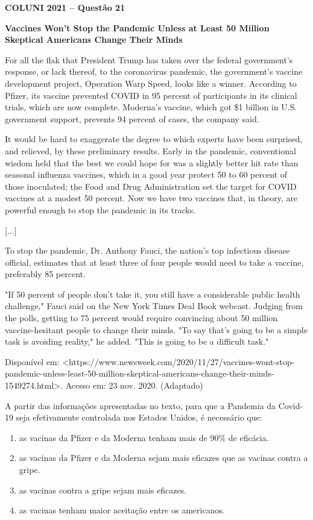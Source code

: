 \textbf{COLUNI 2021 -- Questão 21}\par\medskip \textbf{Vaccines Won't Stop the Pandemic Unless at Least 50 Million Skeptical Americans Change Their Minds}

For all the flak that President Trump has taken over the federal government's response, or lack thereof, to the coronavirus pandemic, the government's vaccine development project, Operation Warp Speed, looks like a winner. According to Pfizer, its vaccine prevented COVID in 95 percent of participants in its clinical trials, which are now complete. Moderna's vaccine, which got \$1 billion in U.S. government support, prevents 94 percent of cases, the company said.

It would be hard to exaggerate the degree to which experts have been surprised, and relieved, by these preliminary results. Early in the pandemic, conventional wisdom held that the best we could hope for was a slightly better hit rate than seasonal influenza vaccines, which in a good year protect 50 to 60 percent of those inoculated; the Food and Drug Administration set the target for COVID vaccines at a modest 50 percent. Now we have two vaccines that, in theory, are powerful enough to stop the pandemic in its tracks.

[...]

To stop the pandemic, Dr. Anthony Fauci, the nation's top infectious disease official, estimates that at least three of four people would need to take a vaccine, preferably 85 percent.

"If 50 percent of people don't take it, you still have a considerable public health challenge," Fauci said on the New York Times Deal Book webcast. Judging from the polls, getting to 75 percent would require convincing about 50 million vaccine-hesitant people to change their minds. "To say that's going to be a simple task is avoiding reality," he added. "This is going to be a difficult task."

Disponível em: <https://www.newsweek.com/2020/11/27/vaccines-wont-stop-pandemic-unless-least-50-million-skeptical-americans-change-their-minds-1549274.html>. Acesso em: 23 nov. 2020. (Adaptado)

\par

A partir das informações apresentadas no texto, para que a Pandemia da Covid-19 seja efetivamente controlada nos Estados Unidos, é necessário que:\begin{enumerate}
\item as vacinas da Pfizer e da Moderna tenham mais de 90\% de eficácia.
\item as vacinas da Pfizer e da Moderna sejam mais eficazes que as vacinas contra a gripe.
\item as vacinas contra a gripe sejam mais eficazes.
\item as vacinas tenham maior aceitação entre os americanos.\end{enumerate}
